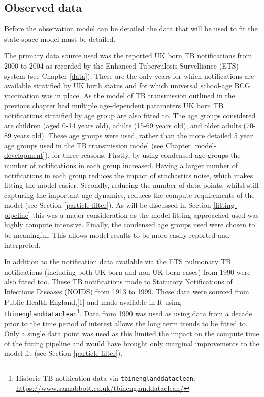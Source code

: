 \documentclass[11pt,twoside]{bristolthesis}
\begin{document}
  \hypertarget{observed-data}{%
  \subsection{Observed data}\label{observed-data}}
  
  Before the observation model can be detailed the data that will be used to fit the state-space model must be detailed.
  
  The primary data source used was the reported UK born TB notifications from 2000 to 2004 as recorded by the Enhanced Tuberculosis Survelliance (ETS) system (see Chapter \ref{data}). These are the only years for which notifications are available stratified by UK birth status and for which universal school-age BCG vaccination was in place. As the model of TB transmission outlined in the previous chapter had multiple age-dependent parameters UK born TB notifications stratified by age group are also fitted to. The age groups considered are children (aged 0-14 years old), adults (15-69 years old), and older adults (70-89 years old). These age groups were used, rather than the more detailed 5 year age groups used in the TB transmission model (see Chapter \ref{model-development}), for three reasons. Firstly, by using condensed age groups the number of notifications in each group increased. Having a larger number of notifications in each group reduces the impact of stochastics noise, which makes fitting the model easier. Secondly, reducing the number of data points, whilst still capturing the important age dynamics, reduces the compute requirements of the model (see Section \ref{particle-filter}). As will be discussed in Section \ref{fitting-pipeline} this was a major consideration as the model fitting approached used was highly compute intensive. Finally, the condensed age groups used were chosen to be meaningful. This allows model results to be more easily reported and interpreted.
  
  In addition to the notification data available via the ETS pulmonary TB notifications (including both UK born and non-UK born cases) from 1990 were also fitted too. These TB notifications made to Statutory Notifications of Infectious Diseases (NOIDS) from 1913 to 1999. These data were sourced from Public Health England,{[}1{]} and made available in R using \texttt{tbinenglanddataclean}\footnote{Historic TB notification data via \texttt{tbinenglanddataclean}: \url{https://www.samabbott.co.uk/tbinenglanddataclean/}}. Data from 1990 was used as using data from a decade prior to the time period of interest allows the long term trends to be fitted to. Only a single data point was used as this limited the impact on the compute time of the fitting pipeline and would have brought only marginal improvements to the model fit (see Section \ref{particle-filter}).
  
\end{document}
